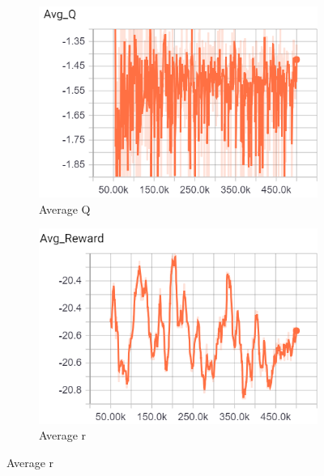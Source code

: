 \documentclass{article}
\begin{document}
\begin{enumerate}
\begin{figure}[H]
	\centering
	\begin{subfigure}[b]{.5\textwidth}
		\centering
		\includegraphics[width=.75\linewidth]{linear-avgq}
		\caption{Average Q}
	\end{subfigure}%
	\begin{subfigure}[b]{.5\textwidth}
		\centering
		\includegraphics[width=.75\linewidth]{linear-avgr}
		\caption{Average r}
	\end{subfigure}
\end{figure}




\end{enumerate}
\end{document}
